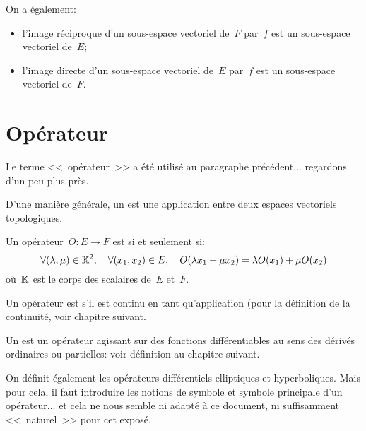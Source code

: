 On a également:
\begin{itemize}
  \item l'image réciproque d'un sous-espace vectoriel de~$F$ par~$f$ est un sous-espace vectoriel de~$E$;
  \item l'image directe d'un sous-espace vectoriel de~$E$ par~$f$ est un sous-espace vectoriel de~$F$.
\end{itemize}

\medskip
\section{Opérateur}

Le terme <<~opérateur~>> a été utilisé au paragraphe précédent... regardons d'un peu
plus près.

\medskip
D'une manière générale, un  est une application entre
deux espaces vectoriels topologiques.

\medskip
Un opérateur~$O: E \to F$ est  si et seulement si:
\begin{equation}\forall (\lambda, \mu) \in \mathbb K^2,\quad\forall (x_1, x_2) \in E,\quad O( \lambda x_1 + \mu x_2)=\lambda O(x_1) + \mu O(x_2)
\end{equation}
où~$\mathbb K$ est le corps des scalaires de~$E$ et~$F$.

\medskip
{}

\medskip
Un opérateur est  s'il est continu en tant qu'application (pour la définition de la
continuité, voir chapitre suivant.


\medskip
Un  est un opérateur agissant sur des
fonctions différentiables au sens des dérivés ordinaires ou partielles: voir définition
au chapitre suivant.

\medskip
On définit également les opérateurs différentiels elliptiques et hyperboliques.
Mais pour cela, il faut introduire les notions de symbole et symbole principale d'un
opérateur... et cela ne nous semble ni adapté à ce document, ni suffisamment
<<~naturel~>> pour cet exposé.




